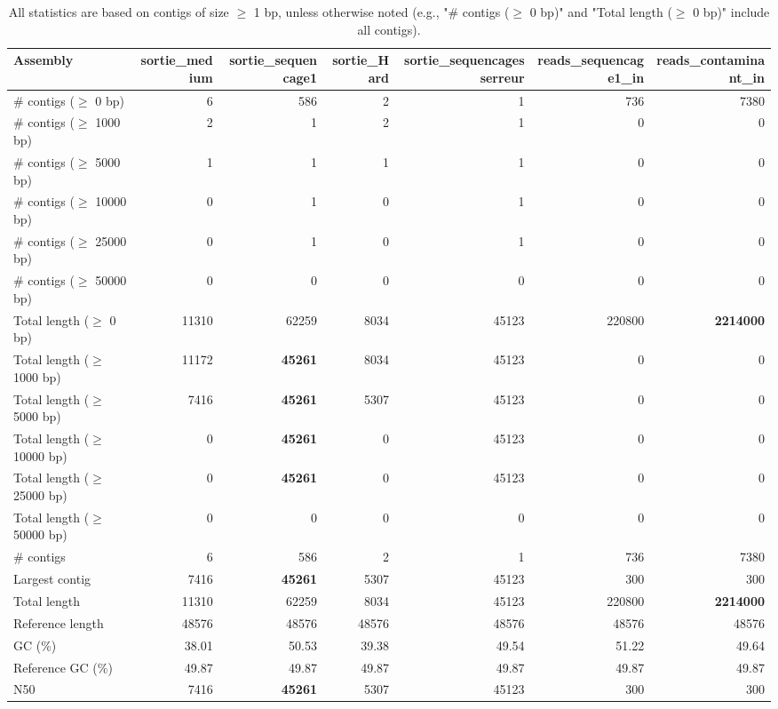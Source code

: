 \documentclass[12pt,a4paper]{article}
\begin{document}
\begin{table}[ht]
\begin{center}
\caption{All statistics are based on contigs of size $\geq$ 1 bp, unless otherwise noted (e.g., "\# contigs ($\geq$ 0 bp)" and "Total length ($\geq$ 0 bp)" include all contigs).}
\begin{tabular}{|l*{6}{|r}|}
\hline
Assembly & sortie\_medium & sortie\_sequencage1 & sortie\_Hard & sortie\_sequencagesserreur & reads\_sequencage1\_in & reads\_contaminant\_in \\ \hline
\# contigs ($\geq$ 0 bp) & 6 & 586 & 2 & 1 & 736 & 7380 \\ \hline
\# contigs ($\geq$ 1000 bp) & 2 & 1 & 2 & 1 & 0 & 0 \\ \hline
\# contigs ($\geq$ 5000 bp) & 1 & 1 & 1 & 1 & 0 & 0 \\ \hline
\# contigs ($\geq$ 10000 bp) & 0 & 1 & 0 & 1 & 0 & 0 \\ \hline
\# contigs ($\geq$ 25000 bp) & 0 & 1 & 0 & 1 & 0 & 0 \\ \hline
\# contigs ($\geq$ 50000 bp) & 0 & 0 & 0 & 0 & 0 & 0 \\ \hline
Total length ($\geq$ 0 bp) & 11310 & 62259 & 8034 & 45123 & 220800 & {\bf 2214000} \\ \hline
Total length ($\geq$ 1000 bp) & 11172 & {\bf 45261} & 8034 & 45123 & 0 & 0 \\ \hline
Total length ($\geq$ 5000 bp) & 7416 & {\bf 45261} & 5307 & 45123 & 0 & 0 \\ \hline
Total length ($\geq$ 10000 bp) & 0 & {\bf 45261} & 0 & 45123 & 0 & 0 \\ \hline
Total length ($\geq$ 25000 bp) & 0 & {\bf 45261} & 0 & 45123 & 0 & 0 \\ \hline
Total length ($\geq$ 50000 bp) & 0 & 0 & 0 & 0 & 0 & 0 \\ \hline
\# contigs & 6 & 586 & 2 & 1 & 736 & 7380 \\ \hline
Largest contig & 7416 & {\bf 45261} & 5307 & 45123 & 300 & 300 \\ \hline
Total length & 11310 & 62259 & 8034 & 45123 & 220800 & {\bf 2214000} \\ \hline
Reference length & 48576 & 48576 & 48576 & 48576 & 48576 & 48576 \\ \hline
GC (\%) & 38.01 & 50.53 & 39.38 & 49.54 & 51.22 & 49.64 \\ \hline
Reference GC (\%) & 49.87 & 49.87 & 49.87 & 49.87 & 49.87 & 49.87 \\ \hline
N50 & 7416 & {\bf 45261} & 5307 & 45123 & 300 & 300 \\ \hline

\end{tabular}
\end{center}
\end{table}
\end{document}
